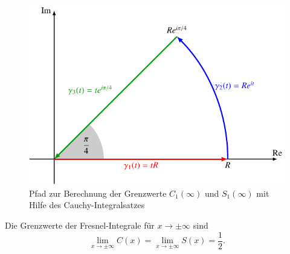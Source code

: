 \begin{figure}
\centering
\includegraphics{papers/fresnel/images/pfad.pdf}
\caption{Pfad zur Berechnung der Grenzwerte $C_1(\infty)$ und
$S_1(\infty)$ mit Hilfe des Cauchy-Integralsatzes
\label{fresnel:figure:pfad}}
\end{figure}


\begin{satz}
Die Grenzwerte der Fresnel-Integrale für $x\to\pm\infty$ sind
\[
\lim_{x\to\pm\infty} C(x)
=
\lim_{x\to\pm\infty} S(x)
=
\frac12.
\]
\end{satz}

